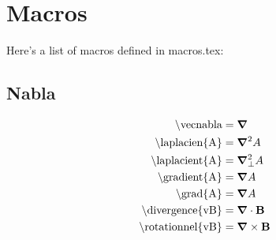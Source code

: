\section{Macros}

Here's a list of macros defined in macros.tex:

\subsection{Nabla}
\begin{align}
\textrm{\textbackslash vecnabla}            & = \bm{\nabla}           \label{eqn:vnabla}      \\
\textrm{\textbackslash laplacien\{A\}}      & = \bm{\nabla}^2 A       \label{eqn:laplacien}   \\
\textrm{\textbackslash laplacient\{A\}}     & = \bm{\nabla}_{\bot}^{2} A      \label{eqn:laplacient}  \\
\textrm{\textbackslash gradient\{A\}}       & = \bm{\nabla} A        \label{eqn:gradient}    \\
\textrm{\textbackslash grad\{A\}}           & = \bm{\nabla} A            \label{eqn:grad}        \\
\textrm{\textbackslash divergence\{vB\}}    & = \bm{\nabla} \cdot \textbf{B}    \label{eqn:divergence}  \\
\textrm{\textbackslash rotationnel\{vB\}}   & = \bm{\nabla} \times \textbf{B}   \label{eqn:rotationnel}
\end{align}

